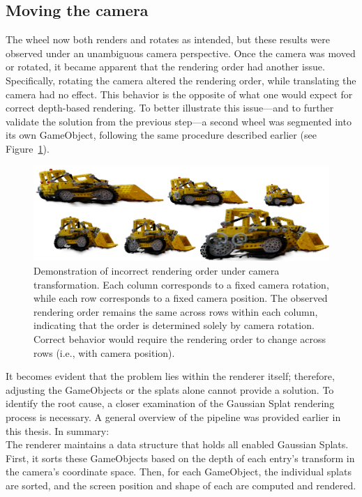 \documentclass[12pt]{article}
\begin{document}
\subsection{Moving the camera}
The wheel now both renders and rotates as intended, but these results were observed under an unambiguous camera perspective. Once the camera was moved or rotated, it became apparent that the rendering order had another issue. Specifically, rotating the camera altered the rendering order, while translating the camera had no effect. This behavior is the opposite of what one would expect for correct depth-based rendering. To better illustrate this issue—and to further validate the solution from the previous step—a second wheel was segmented into its own GameObject, following the same procedure described earlier (see Figure~\ref{fig:camera_change}).
\begin{figure}[h!]
	\centering
	\includegraphics[width=\textwidth]{Images/camera_order.png}
	\caption{Demonstration of incorrect rendering order under camera transformation. Each column corresponds to a fixed camera rotation, while each row corresponds to a fixed camera position. The observed rendering order remains the same across rows within each column, indicating that the order is determined solely by camera rotation. Correct behavior would require the rendering order to change across rows (i.e., with camera position).}
	\label{fig:camera_change}
\end{figure}
\FloatBarrier
\noindent
It becomes evident that the problem lies within the renderer itself; therefore, adjusting the GameObjects or the splats alone cannot provide a solution. To identify the root cause, a closer examination of the Gaussian Splat rendering process is necessary. A general overview of the pipeline was provided earlier in this thesis. In summary:\\
The renderer maintains a data structure that holds all enabled Gaussian Splats. First, it sorts these GameObjects based on the depth of each entry’s transform in the camera’s coordinate space. Then, for each GameObject, the individual splats are sorted, and the screen position and shape of each are computed and rendered.\\
\end{document}
